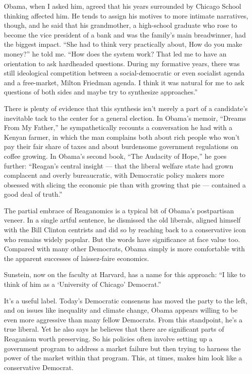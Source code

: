 Obama, when I asked him, agreed that his years surrounded by Chicago
School thinking affected him. He tends to assign his motives to more
intimate narratives, though, and he said that his grandmother, a
high-school graduate who rose to become the vice president of a bank and
was the family's main breadwinner, had the biggest impact. ``She had to
think very practically about, How do you make money?'' he told me. ``How
does the system work? That led me to have an orientation to ask
hardheaded questions. During my formative years, there was still
ideological competition between a social-democratic or even socialist
agenda and a free-market, Milton Friedman agenda. I think it was natural
for me to ask questions of both sides and maybe try to synthesize
approaches.''

There is plenty of evidence that this synthesis isn't merely a part of a
candidate's inevitable tack to the center for a general election. In
Obama's memoir, ``Dreams From My Father,'' he sympathetically recounts a
conversation he had with a Kenyan farmer, in which the man complains
both about rich people who won't pay their fair share of taxes and about
burdensome government regulations on coffee growing. In Obama's second
book, ``The Audacity of Hope,'' he goes further: ``Reagan's central
insight --- that the liberal welfare state had grown complacent and
overly bureaucratic, with Democratic policy makers more obsessed with
slicing the economic pie than with growing that pie --- contained a good
deal of truth.''

The partial embrace of Reaganomics is a typical bit of Obama's
postpartisan veneer. In a single artful sentence, he dismissed the old
liberals, aligned himself with the Bill Clinton centrists and did so by
reaching back to a conservative icon who remains widely popular. But the
words have significance at face value too. Compared with many other
Democrats, Obama simply is more comfortable with the apparent successes
of laissez-faire economics.

Sunstein, now on the faculty at Harvard, has a name for this approach:
``I like to think of him as a `University of Chicago' Democrat.''

It's a useful label. Today's Democratic consensus has moved the party to
the left, and on issues like inequality and climate change, Obama
appears willing to be even more aggressive than many fellow Democrats.
From this standpoint, he's a true liberal. Yet he also says he believes
that there are significant parts of Reaganism worth preserving. So his
policies often involve setting up a government program to address a
market failure but then trying to harness the power of the market within
that program. This, at times, makes him look like a conservative
Democrat.

